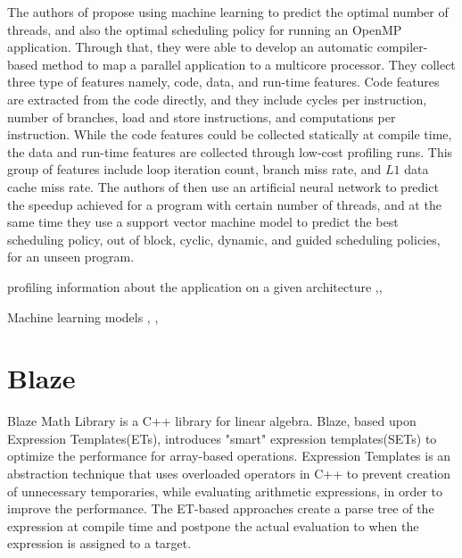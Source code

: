 The authors of \cite{wang2009mapping} propose using machine learning to predict the optimal number of threads, and also the optimal scheduling policy for running an OpenMP application. Through that, they were able to develop an automatic compiler-based method to map a parallel application to a multicore processor. They collect three type of features namely, code, data, and run-time features. Code features are extracted from the code directly, and they include cycles per instruction, number of branches, load and store instructions, and computations per instruction. While the code features could be collected statically at compile time, the data and run-time features are collected through low-cost profiling runs. This group of features include loop iteration count, branch miss rate, and $L1$ data cache miss rate. The authors of \cite{wang2009mapping} then use an artificial neural network to predict the speedup achieved for a program with certain number of threads, and at the same time they use a support vector machine model to predict the best scheduling policy, out of block, cyclic, dynamic, and guided scheduling policies, for an unseen program.



	
	
	
	
\cite{treibig2012performance} 
profiling information about the application on a given architecture
\cite{cammarota2012just},\cite{zhang2005runtime},\cite{thoman2012automatic}

Machine learning models 
\cite{singh2009real}, \cite{zomaya2001observations}, \cite{qawasmeh2015adaptive}



	

	

\cite{li2009machine}
	

\section{Blaze}
Blaze Math Library\cite{iglberger2012expression} is a C++ library for linear algebra. Blaze, based upon Expression Templates(ETs)\cite{veldhuizen1995expression}, introduces "smart" expression templates(SETs)\cite{iglberger2012expression} to optimize the performance for array-based operations. Expression Templates\cite{veldhuizen1995expression} is an abstraction technique that uses overloaded operators in C++ to prevent creation of unnecessary temporaries, while evaluating arithmetic expressions, in order to improve the performance\cite{iglberger2012expression}. The ET-based approaches create a parse tree of the expression at compile time and postpone the actual evaluation to when the expression is assigned to a target. 

